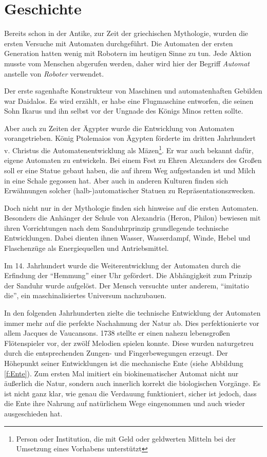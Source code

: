\section{Geschichte}
Bereits schon in der Antike, zur Zeit der griechischen Mythologie, wurden die ersten Versuche mit Automaten durchgeführt. Die Automaten der ersten Generation hatten wenig mit Robotern im heutigen Sinne zu tun. Jede Aktion musste vom Menschen abgerufen werden, daher wird hier der Begriff \textit{Automat} anstelle von \textit{Roboter} verwendet.

Der erste sagenhafte Konstrukteur von Maschinen und automatenhaften Gebilden war Daidalos. Es wird erzählt, er habe eine Flugmaschine entworfen, die seinen Sohn Ikarus und ihn selbst vor der Ungnade des Königs Minos retten sollte. 

Aber auch zu Zeiten der Ägypter wurde die Entwicklung von Automaten vorangetrieben. König Ptolemaios von Ägypten förderte im dritten Jahrhundert v. Christus die Automatenentwicklung als Mäzen\footnote{Person oder Institution, die mit Geld oder geldwerten Mitteln bei der Umsetzung eines Vorhabens unterstützt}. Er war auch bekannt dafür, eigene Automaten zu entwickeln. Bei einem Fest zu Ehren Alexanders des Großen soll er eine Statue gebaut haben, die auf ihrem Weg aufgestanden ist und Milch in eine Schale gegossen hat. Aber auch in anderen Kulturen finden sich Erwähnungen solcher (halb-)automatischer Statuen zu Repräsentationszwecken.

Doch nicht nur in der Mythologie finden sich hinweise auf die ersten Automaten. Besonders die Anhänger der Schule von Alexandria (Heron, Philon) bewiesen mit ihren Vorrichtungen nach dem Sanduhrprinzip grundlegende technische Entwicklungen. Dabei dienten ihnen Wasser, Wasserdampf, Winde, Hebel und Flaschenzüge als Energiequellen und Antriebsmittel.

Im 14. Jahrhundert wurde die Weiterentwicklung der Automaten durch die Erfindung der "`Hemmung"' einer Uhr gefördert. Die Abhängigkeit zum Prinzip der Sanduhr wurde aufgelöst. Der Mensch versuchte unter anderem, "`imitatio die"', ein maschinalisiertes Universum nachzubauen. 

In den folgenden Jahrhunderten zielte die technische Entwicklung der Automaten immer mehr auf die perfekte Nachahmung der Natur  ab. Dies perfektionierte vor allem Jacques de Vaucansons. 1738 stellte er einen nahezu lebensgroßen Flötenspieler vor, der zwölf Melodien spielen konnte. Diese wurden naturgetreu durch die entsprechenden Zungen- und Fingerbewegungen erzeugt. Der Höhepunkt seiner Entwicklungen ist die mechanische Ente (siehe Abbildung \ref{f:Ente}). Zum ersten Mal imitiert ein biokinematischer Automat nicht nur äußerlich die Natur, sondern auch innerlich korrekt die biologischen Vorgänge. Es ist nicht ganz klar, wie genau die Verdauung funktioniert, sicher ist jedoch, dass die Ente ihre Nahrung auf natürlichem Wege eingenommen und auch wieder ausgeschieden hat.  

